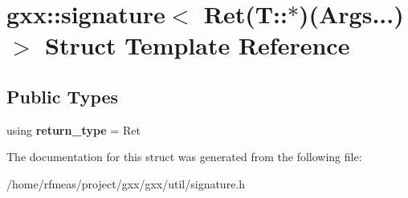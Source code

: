 \hypertarget{structgxx_1_1signature_3_01Ret_07T_1_1_5_08_07Args_8_8_8_08_4}{}\section{gxx\+:\+:signature$<$ Ret(T\+:\+:$\ast$)(Args...)$>$ Struct Template Reference}
\label{structgxx_1_1signature_3_01Ret_07T_1_1_5_08_07Args_8_8_8_08_4}
\subsection*{Public Types}
\begin{DoxyCompactItemize}
\item 
using {\bfseries return\+\_\+type} = Ret\hypertarget{structgxx_1_1signature_3_01Ret_07T_1_1_5_08_07Args_8_8_8_08_4_a3e7531620e1731f93946bb65555650c1}{}\label{structgxx_1_1signature_3_01Ret_07T_1_1_5_08_07Args_8_8_8_08_4_a3e7531620e1731f93946bb65555650c1}

\end{DoxyCompactItemize}


The documentation for this struct was generated from the following file\+:\begin{DoxyCompactItemize}
\item 
/home/rfmeas/project/gxx/gxx/util/signature.\+h\end{DoxyCompactItemize}
